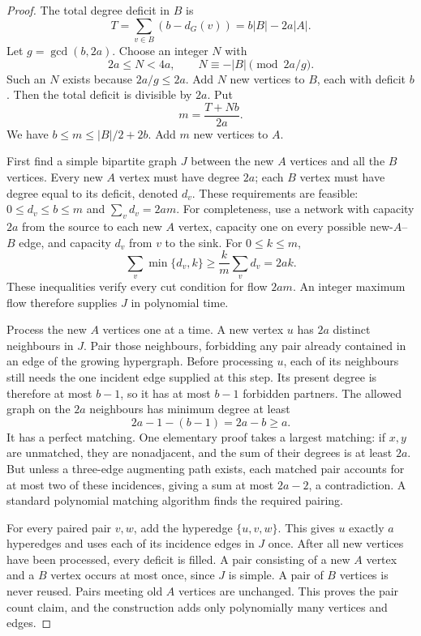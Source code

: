 \documentclass[11pt]{article}
\theoremstyle{definition}\newtheorem{algorithm}{Algorithm}[section]
\numberwithin{equation}{section}
\theoremstyle{remark}\newtheorem*{remark}{Remark}
\begin{document}
\begin{proof}
The total degree deficit in $B$ is
\[
 T=\sum_{v\in B}(b-d_G(v))=b|B|-2a|A|.
\]
Let $g=\gcd(b,2a)$. Choose an integer $N$ with
\[
 2a\le N<4a,\qquad N\equiv-|B|\pmod{2a/g}.
\]
Such an $N$ exists because $2a/g\le2a$. Add $N$ new vertices to $B$,
each with deficit $b$. Then the total deficit is divisible by $2a$.
Put
\[
 m=\frac{T+Nb}{2a}.
\]
We have $b\le m\le |B|/2+2b$. Add $m$ new vertices to $A$.

First find a simple bipartite graph $J$ between the new $A$ vertices
and all the $B$ vertices. Every new $A$ vertex must have degree $2a$;
each $B$ vertex must have degree equal to its deficit, denoted $d_v$.
These requirements are feasible: $0\le d_v\le b\le m$ and
$\sum_vd_v=2am$. For completeness, use a network with capacity $2a$
from the source to each new $A$ vertex, capacity one on every possible
new-$A$--$B$ edge, and capacity $d_v$ from $v$ to the sink. For
$0\le k\le m$,
\[
 \sum_v\min\{d_v,k\}\ge\frac{k}{m}\sum_vd_v=2ak.
\]
These inequalities verify every cut condition for flow $2am$.
An integer maximum flow therefore supplies $J$ in polynomial time.

Process the new $A$ vertices one at a time. A new vertex $u$ has
$2a$ distinct neighbours in $J$. Pair those neighbours, forbidding
any pair already contained in an edge of the growing hypergraph.
Before processing $u$, each of its neighbours still needs the one
incident edge supplied at this step. Its present degree is therefore
at most $b-1$, so it has at most $b-1$ forbidden partners. The allowed
graph on the $2a$ neighbours has minimum degree at least
\[
 2a-1-(b-1)=2a-b\ge a.
\]
It has a perfect matching. One elementary proof takes a largest
matching: if $x,y$ are unmatched, they are nonadjacent, and the sum
of their degrees is at least $2a$. But unless a three-edge augmenting
path exists, each matched pair accounts for at most two of these
incidences, giving a sum at most $2a-2$, a contradiction. A standard
polynomial matching algorithm finds the required pairing.

For every paired pair $v,w$, add the hyperedge $\{u,v,w\}$. This
gives $u$ exactly $a$ hyperedges and uses each of its incidence edges
in $J$ once. After all new vertices have been processed, every deficit
is filled. A pair consisting of a new $A$ vertex and a $B$ vertex
occurs at most once, since $J$ is simple. A pair of $B$ vertices is
never reused. Pairs meeting old $A$ vertices are unchanged. This proves
the pair count claim, and the construction adds only polynomially many
vertices and edges.
\end{proof}
\end{document}
